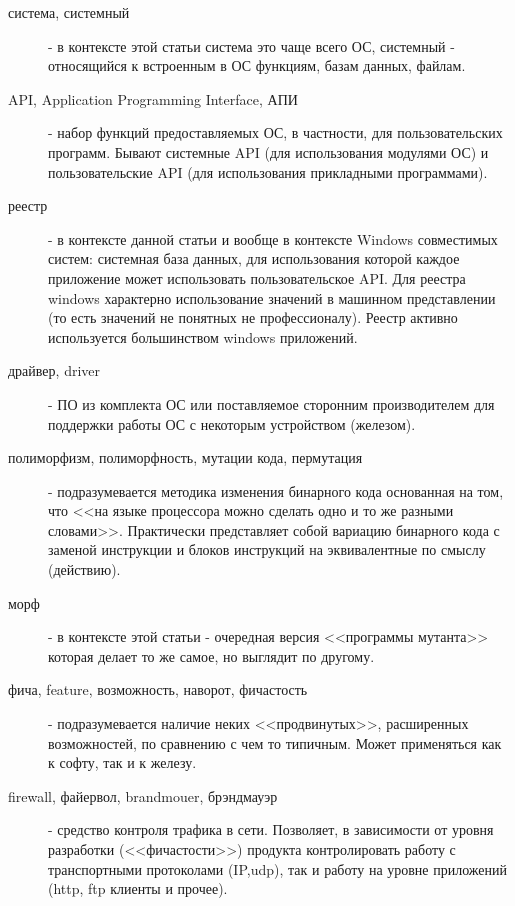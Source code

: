 \begin{description}
\item [ система, системный ]
 - в контексте этой статьи система это чаще всего ОС, системный - относящийся к встроенным в ОС функциям, базам данных, файлам.

\item[ API, Application Programming Interface, АПИ ]
 - набор функций предоставляемых ОС, в частности, для пользовательских программ. Бывают системные
 API (для использования модулями ОС) и пользовательские API (для использования прикладными программами).

\item [ реестр ]
 - в контексте данной статьи и вообще в контексте Windows совместимых систем: системная база данных,
 для использования которой каждое приложение может использовать пользовательское API. Для реестра
 windows характерно использование значений в машинном представлении (то есть значений не понятных не
 профессионалу). Реестр активно используется большинством windows приложений.

\item[драйвер, driver]
 - ПО из комплекта ОС или поставляемое сторонним производителем для поддержки работы ОС с
 некоторым устройством (железом).

\item[полиморфизм, полиморфность, мутации кода, пермутация]
 - подразумевается методика изменения бинарного кода основанная на том, что
 <<на языке процессора можно сделать одно и то же разными словами>>. Практически
 представляет собой вариацию бинарного кода с заменой инструкции и блоков
инструкций на эквивалентные по смыслу (действию).

\item[морф]
 - в контексте этой статьи - очередная версия <<программы мутанта>> которая делает то же самое, но выглядит по другому.

\item[ фича, feature, возможность, наворот, фичастость ]
 - подразумевается наличие неких <<продвинутых>>, расширенных возможностей, по сравнению
 с чем то типичным. Может применяться как к софту, так и к железу.

\item[firewall, файервол, brandmouer, брэндмауэр]
 - средство контроля трафика в сети. Позволяет, в зависимости от уровня разработки
(<<фичастости>>) продукта контролировать работу с транспортными протоколами (IP,udp),
 так и работу на уровне приложений (http, ftp клиенты и прочее).


\end{description}
